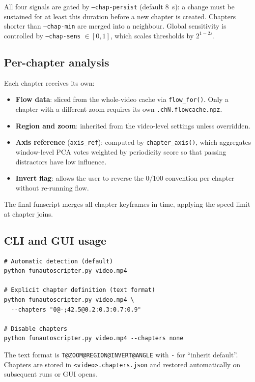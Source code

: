 \documentclass[12pt,a4paper]{article}
\begin{document}
All four signals are gated by \texttt{--chap-persist} (default 8~s): a change
must be sustained for at least this duration before a new chapter is created.
Chapters shorter than \texttt{--chap-min} are merged into a neighbour. Global
sensitivity is controlled by \texttt{--chap-sens} $\in [0,1]$, which scales
thresholds by $2^{1-2s}$.

\subsection{Per-chapter analysis}

Each chapter receives its own:
\begin{itemize}[nosep]
  \item \textbf{Flow data}: sliced from the whole-video cache via
    \texttt{flow\_for()}. Only a chapter with a different zoom requires its own
    \texttt{.chN.flowcache.npz}.
  \item \textbf{Region and zoom}: inherited from the video-level settings
    unless overridden.
  \item \textbf{Axis reference} (\texttt{axis\_ref}): computed by
    \texttt{chapter\_axis()}, which aggregates window-level PCA votes weighted
    by periodicity score so that passing distractors have low influence.
  \item \textbf{Invert flag}: allows the user to reverse the 0/100 convention
    per chapter without re-running flow.
\end{itemize}

The final funscript merges all chapter keyframes in time, applying the speed
limit at chapter joins.

\subsection{CLI and GUI usage}

\begin{lstlisting}[style=pysnip]
# Automatic detection (default)
python funautoscripter.py video.mp4

# Explicit chapter definition (text format)
python funautoscripter.py video.mp4 \
  --chapters "0@-;42.5@0.2:0.3:0.7:0.9"

# Disable chapters
python funautoscripter.py video.mp4 --chapters none
\end{lstlisting}

The text format is \texttt{T@ZOOM@REGION@INVERT@ANGLE} with \texttt{-} for
``inherit default''. Chapters are stored in \texttt{<video>.chapters.json} and
restored automatically on subsequent runs or GUI opens.
\end{document}
